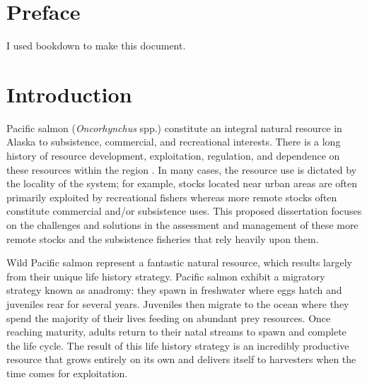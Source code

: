 \documentclass[12pt,]{book}
\theoremstyle{definition}
\theoremstyle{definition}
\theoremstyle{definition}
\theoremstyle{remark}
\begin{document}
\setlength{\parskip}{0pt plus 0pt minus 0pt}

\doublespacing

\chapter*{Preface}\label{preface}

I used bookdown \citep{xie-2015} to make this document.

\chapter{Introduction}\label{ch1}

\noindent
Pacific salmon (\emph{Oncorhynchus} spp.) constitute an integral natural
resource in Alaska to subsistence, commercial, and recreational
interests. There is a long history of resource development,
exploitation, regulation, and dependence on these resources within the
region \citep{cooley-1963}. In many cases, the resource use is dictated
by the locality of the system; for example, stocks located near urban
areas are often primarily exploited by recreational fishers whereas more
remote stocks often constitute commercial and/or subsistence uses. This
proposed dissertation focuses on the challenges and solutions in the
assessment and management of these more remote stocks and the
subsistence fisheries that rely heavily upon them.

Wild Pacific salmon represent a fantastic natural resource, which
results largely from their unique life history strategy. Pacific salmon
exhibit a migratory strategy known as anadromy: they spawn in freshwater
where eggs hatch and juveniles rear for several years. Juveniles then
migrate to the ocean where they spend the majority of their lives
feeding on abundant prey resources. Once reaching maturity, adults
return to their natal streams to spawn and complete the life cycle. The
result of this life history strategy is an incredibly productive
resource that grows entirely on its own and delivers itself to
harvesters when the time comes for exploitation.
\end{document}
